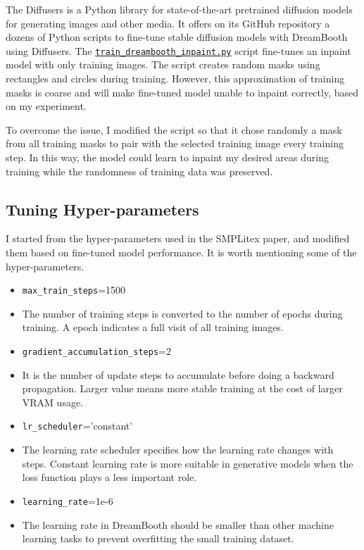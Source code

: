 \documentclass[acmtog]{acmart}
\begin{document}
The Diffusers \cite{von-platen-etal-2022-diffusers} is a Python library for state-of-the-art pretrained diffusion models for generating images and other media. It offers on its GitHub repository a dozens of Python scripts to fine-tune stable diffusion models with DreamBooth using Diffusers. The \href{https://github.com/huggingface/diffusers/blob/main/examples/research\_projects/dreambooth\_inpaint/train\_dreambooth\_inpaint.py}{\texttt{train\_dreambooth\_inpaint.py}} script fine-tunes an inpaint model with only training images. The script creates random masks using rectangles and circles during training. However, this approximation of training masks is coarse and will make fine-tuned model unable to inpaint correctly, based on my experiment.

To overcome the issue, I modified the script so that it chose randomly a mask from all training masks to pair with the selected training image every training step. In this way, the model could learn to inpaint my desired areas during training while the randomness of training data was preserved.

\subsection{Tuning Hyper-parameters}

I started from the hyper-parameters used in the SMPLitex paper, and modified them based on fine-tuned model performance. It is worth mentioning some of the hyper-parameters.

\begin{itemize}
  \item \texttt{max\_train\_steps}=1500
  \item[] The number of training steps is converted to the number of epochs during training. A epoch indicates a full visit of all training images.
  \item \texttt{gradient\_accumulation\_steps}=2
  \item[] It is the number of update steps to accumulate before doing a backward propagation. Larger value means more stable training at the cost of larger VRAM usage.
  \item \texttt{lr\_scheduler}='constant'
  \item[] The learning rate scheduler specifies how the learning rate changes with steps. Constant learning rate is more suitable in generative models when the loss function plays a less important role.
  \item \texttt{learning\_rate}=1e-6
  \item[] The learning rate in DreamBooth should be smaller than other machine learning tasks to prevent overfitting the small training dataset.
\end{itemize}
\end{document}
